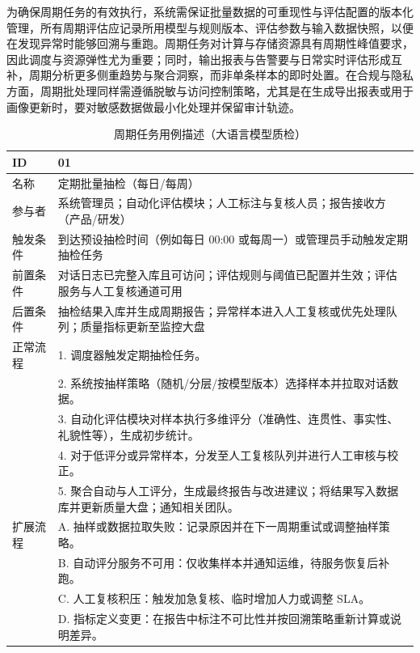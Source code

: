 为确保周期任务的有效执行，系统需保证批量数据的可重现性与评估配置的版本化管理，所有周期评估应记录所用模型与规则版本、评估参数与输入数据快照，以便在发现异常时能够回溯与重跑。周期任务对计算与存储资源具有周期性峰值要求，因此调度与资源弹性尤为重要；同时，输出报表与告警要与日常实时评估形成互补，周期分析更多侧重趋势与聚合洞察，而非单条样本的即时处置。在合规与隐私方面，周期批处理同样需遵循脱敏与访问控制策略，尤其是在生成导出报表或用于画像更新时，要对敏感数据做最小化处理并保留审计轨迹。
\begin{table}[htb]
\caption{周期任务用例描述（大语言模型质检）}
\label{tab:periodic-usecase}
{\renewcommand{\arraystretch}{1.2}
\begin{tabular}{p{3cm} p{10cm}}
\hline
ID & 01 \\ \hline
名称 & 定期批量抽检（每日/每周） \\ \hline
参与者 & 系统管理员；自动化评估模块；人工标注与复核人员；报告接收方（产品/研发） \\ \hline
触发条件 & 到达预设抽检时间（例如每日 00:00 或每周一）或管理员手动触发定期抽检任务 \\ \hline
前置条件 & 对话日志已完整入库且可访问；评估规则与阈值已配置并生效；评估服务与人工复核通道可用 \\ \hline
后置条件 & 抽检结果入库并生成周期报告；异常样本进入人工复核或优先处理队列；质量指标更新至监控大盘 \\ \hline
正常流程 & 1. 调度器触发定期抽检任务。\\
 & 2. 系统按抽样策略（随机/分层/按模型版本）选择样本并拉取对话数据。\\
 & 3. 自动化评估模块对样本执行多维评分（准确性、连贯性、事实性、礼貌性等），生成初步统计。\\
 & 4. 对于低评分或异常样本，分发至人工复核队列并进行人工审核与校正。\\
 & 5. 聚合自动与人工评分，生成最终报告与改进建议；将结果写入数据库并更新质量大盘；通知相关团队。 \\ \hline
扩展流程 & A. 抽样或数据拉取失败：记录原因并在下一周期重试或调整抽样策略。\\
 & B. 自动评分服务不可用：仅收集样本并通知运维，待服务恢复后补跑。\\
 & C. 人工复核积压：触发加急复核、临时增加人力或调整 SLA。\\
 & D. 指标定义变更：在报告中标注不可比性并按回溯策略重新计算或说明差异。 \\ \hline
\end{tabular}
}
\end{table}

